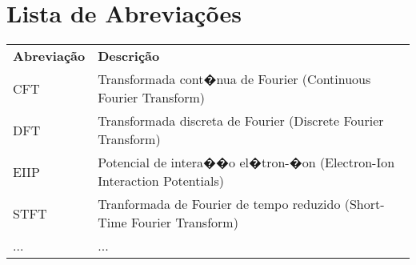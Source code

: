 \chapter*{Lista de Abreviações} 

\begin{longtable}[l]{l l} 
   \textbf{Abreviação}	& \textbf{Descrição} \\
   
   CFT & Transformada cont�nua de Fourier (Continuous Fourier Transform) \\
   DFT & Transformada discreta de Fourier (Discrete Fourier Transform) \\
   EIIP & Potencial de intera��o el�tron-�on (Electron-Ion Interaction Potentials) \\ 
   STFT & Tranformada de Fourier de tempo reduzido (Short-Time Fourier Transform) \\
   ... & ... \\ 
\end{longtable}
